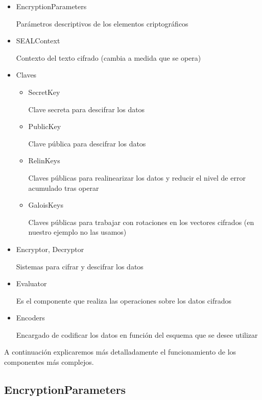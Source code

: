 \begin{itemize}
  \item EncryptionParameters

  Parámetros descriptivos de los elementos criptográficos

  \item SEALContext

  Contexto del texto cifrado (cambia a medida que se opera)

  \item Claves

  \begin{itemize}

    \item SecretKey

    Clave secreta para descifrar los datos

    \item PublicKey

    Clave pública para descifrar los datos

    \item RelinKeys

    Claves públicas para realinearizar los datos y reducir el nivel de error acumulado tras operar

    \item GaloisKeys

    Claves públicas para trabajar con rotaciones en los vectores cifrados (en nuestro ejemplo no las usamos)

  \end{itemize}

  \item Encryptor, Decryptor

  Sistemas para cifrar y descifrar los datos

  \item Evaluator

  Es el componente que realiza las operaciones sobre los datos cifrados

  \item Encoders

  Encargado de codificar los datos en función del esquema que se desee utilizar

\end{itemize}

A continuación explicaremos más detalladamente el funcionamiento de los componentes más complejos.

\subsection{EncryptionParameters}

